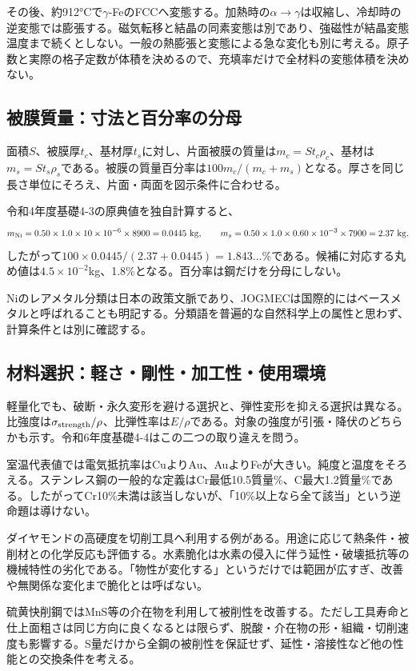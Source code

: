 その後、約912°Cで\(\gamma\)-FeのFCCへ変態する。加熱時の\(\alpha\to\gamma\)は収縮し、冷却時の逆変態では膨張する\cite{iron_transform2023}。磁気転移と結晶の同素変態は別であり、強磁性が結晶変態温度まで続くとしない。一般の熱膨張と変態による急な変化も別に考える。原子数と実際の格子定数が体積を決めるので、充填率だけで全材料の変態体積を決めない。

\subsection{被膜質量：寸法と百分率の分母}
\label{theory:material:coating}
面積\(S\)、被膜厚\(t_c\)、基材厚\(t_s\)に対し、片面被膜の質量は\(m_c=St_c\rho_c\)、基材は\(m_s=St_s\rho_s\)である。被膜の質量百分率は\(100m_c/(m_c+m_s)\)となる。厚さを同じ長さ単位にそろえ、片面・両面を図示条件に合わせる。

令和4年度基礎4-3の原典値を独自計算すると、
\[
 m_{\rm Ni}=0.50\times1.0\times10\times10^{-6}\times8900
 =0.0445\ {\rm kg},\qquad
 m_s=0.50\times1.0\times0.60\times10^{-3}\times7900
 =2.37\ {\rm kg}.
\]
したがって\(100\times0.0445/(2.37+0.0445)=1.843\ldots\%\)である。候補に対応する丸め値は\(4.5\times10^{-2}\)kg、1.8\%となる。百分率は鋼だけを分母にしない。

Niのレアメタル分類は日本の政策文脈であり、JOGMECは国際的にはベースメタルと呼ばれることも明記する\cite{jogmec_nickel2014}。分類語を普遍的な自然科学上の属性と思わず、計算条件とは別に確認する。

\subsection{材料選択：軽さ・剛性・加工性・使用環境}
\label{theory:material:selection}
軽量化でも、破断・永久変形を避ける選択と、弾性変形を抑える選択は異なる。比強度は\(\sigma_{\rm strength}/\rho\)、比弾性率は\(E/\rho\)である。対象の強度が引張・降伏のどちらかも示す。令和6年度基礎4-4はこの二つの取り違えを問う。

室温代表値では電気抵抗率はCuよりAu、AuよりFeが大きい\cite{openstax_resistivity}。純度と温度をそろえる。ステンレス鋼の一般的な定義はCr最低10.5質量\%、C最大1.2質量\%である\cite{stainless_definition2022}。したがってCr10\%未満は該当しないが、「10\%以上なら全て該当」という逆命題は導けない。

ダイヤモンドの高硬度を切削工具へ利用する例がある\cite{nims_diamond2007}。用途に応じて熱条件・被削材との化学反応も評価する。水素脆化は水素の侵入に伴う延性・破壊抵抗等の機械特性の劣化である。「物性が変化する」というだけでは範囲が広すぎ、改善や無関係な変化まで脆化とは呼ばない\cite{nims_hydrogen2024}。

硫黄快削鋼ではMnS等の介在物を利用して被削性を改善する。ただし工具寿命と仕上面粗さは同じ方向に良くなるとは限らず、脱酸・介在物の形・組織・切削速度も影響する\cite{sulfur_machinability2004}。S量だけから全鋼の被削性を保証せず、延性・溶接性など他の性能との交換条件を考える。
